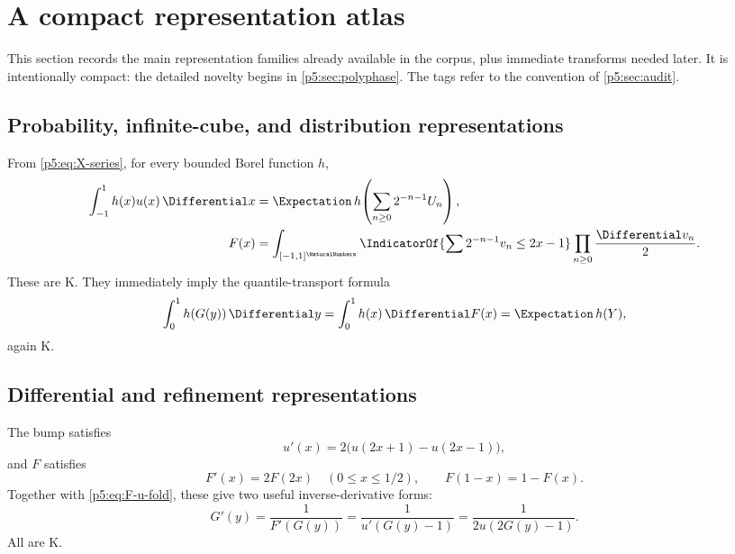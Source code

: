 \documentclass[11pt]{article}
\theoremstyle{definition}
\theoremstyle{remark}
\newcommand{\statusknown}{\textsf{K}}
\begin{document}
\section{A compact representation atlas}
\label{p5:sec:atlas}

This section records the main representation families already available in the
corpus, plus immediate transforms needed later.  It is intentionally compact:
the detailed novelty begins in \cref{p5:sec:polyphase}.  The tags refer to the
convention of \cref{p5:sec:audit}.

\subsection{Probability, infinite-cube, and distribution representations}

From \eqref{p5:eq:X-series}, for every bounded Borel function $h$,
\begin{align}
 \int_{-1}^{1}h(x)u(x)\,\Differential x
 &=\Expectation\,h\!\left(\sum_{n\ge0}2^{-n-1}U_n\right),             \label{p5:eq:prob-test}\\
 F(x)
 &=\int_{[-1,1]^{\NaturalNumbers}}\IndicatorOf{\sum 2^{-n-1}v_n\le2x-1}
       \prod_{n\ge0}\frac{\Differential v_n}{2}.                   \label{p5:eq:infinite-cube-F}
\end{align}
These are \statusknown.  They immediately imply the quantile-transport formula
\begin{equation}
 \int_0^1 h(G(y))\,\Differential y
 =\int_0^1 h(x)\,\Differential F(x)
 =\Expectation\,h(Y),                                                \label{p5:eq:quantile-transport}
\end{equation}
again \statusknown.

\subsection{Differential and refinement representations}

The bump satisfies
\begin{equation}
 u'(x)=2\bigl(u(2x+1)-u(2x-1)\bigr),                        \label{p5:eq:u-DDE}
\end{equation}
and $F$ satisfies
\begin{equation}
 F'(x)=2F(2x)\quad(0\le x\le1/2),
 \qquad F(1-x)=1-F(x).                                     \label{p5:eq:F-DDE}
\end{equation}
Together with \eqref{p5:eq:F-u-fold}, these give two useful inverse-derivative
forms:
\begin{equation}
 G'(y)=\frac1{F'(G(y))}
 =\frac1{u'(G(y)-1)}
 =\frac1{2u(2G(y)-1)}.                                     \label{p5:eq:G-prime}
\end{equation}
All are \statusknown.
\end{document}
